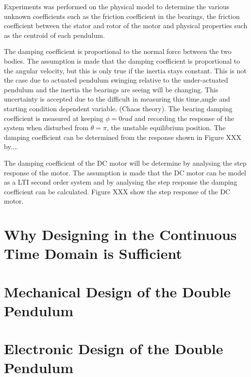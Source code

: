 \documentclass[a4paper,12pt]{article}
\begin{document}
	Experiments was performed on the physical model to determine the various unknown coefficients such as the friction coefficient in the bearings, the friction coefficient between the stator and rotor of the motor and physical properties such as the centroid of each pendulum. 
	
	The damping coefficient is proportional to the normal force between the two bodies. The assumption is made that the damping coefficient is proportional to the angular velocity, but this is only true if the inertia stays constant. This is not the case due to actuated pendulum swinging relative to the under-actuated pendulum and the inertia the bearings are seeing will be changing. This uncertainty is accepted due to the difficult in measuring this time,angle and starting condition dependent variable. (Chaos theory). The bearing damping coefficient is measured at keeping $\phi = 0 rad$ and recording the response of the system when disturbed from $\theta = \pi$, the unstable equilibrium position. The damping coefficient can be determined from the response shown in Figure XXX by....
	
	The damping coefficient of the DC motor will be determine by analysing the step response of the motor. The assumption is made that the DC motor can be model as a LTI second order system and by analysing the step response the damping coefficient can be calculated. Figure XXX show the step response of the DC motor.
	
	\section{Why Designing in the Continuous Time Domain is Sufficient}
	
	\section{Mechanical Design of the Double Pendulum}
	
	
	\newpage
	\section{Electronic Design of the Double Pendulum}
	
\end{document}
